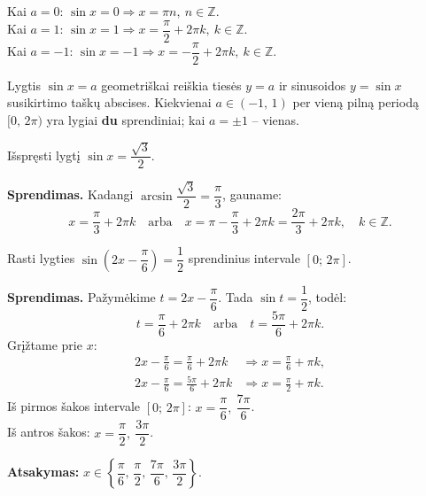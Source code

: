 \begin{remark}
Kai \(a = 0\): \(\sin x = 0 \Rightarrow x = \pi n,\ n \in \mathbb{Z}\).\\
Kai \(a = 1\): \(\sin x = 1 \Rightarrow x = \dfrac{\pi}{2} + 2\pi k,\ k \in \mathbb{Z}\).\\
Kai \(a = -1\): \(\sin x = -1 \Rightarrow x = -\dfrac{\pi}{2} + 2\pi k,\ k \in \mathbb{Z}\).
\end{remark}

\begin{tcolorbox}[title={Geometrinė interpretacija}]
Lygtis \(\sin x = a\) geometriškai reiškia tiesės \(y = a\) ir sinusoidos \(y = \sin x\) susikirtimo taškų abscises. Kiekvienai \(a \in (-1,\, 1)\) per vieną pilną periodą \([0,\, 2\pi)\) yra lygiai \textbf{du} sprendiniai; kai \(a = \pm 1\) – vienas.
\end{tcolorbox}

\begin{example}
Išspręsti lygtį \(\sin x = \dfrac{\sqrt{3}}{2}\).

\textbf{Sprendimas.} Kadangi \(\arcsin\dfrac{\sqrt{3}}{2} = \dfrac{\pi}{3}\), gauname:
\[
x = \frac{\pi}{3} + 2\pi k \quad \text{arba} \quad x = \pi - \frac{\pi}{3} + 2\pi k = \frac{2\pi}{3} + 2\pi k, \quad k \in \mathbb{Z}.
\]
\end{example}

\begin{example}
Rasti lygties \(\sin\!\left(2x - \dfrac{\pi}{6}\right) = \dfrac{1}{2}\) sprendinius intervale \([0;\, 2\pi]\).

\textbf{Sprendimas.} Pažymėkime \(t = 2x - \dfrac{\pi}{6}\). Tada \(\sin t = \dfrac{1}{2}\), todėl:
\[
t = \frac{\pi}{6} + 2\pi k \quad \text{arba} \quad t = \frac{5\pi}{6} + 2\pi k.
\]
Grįžtame prie \(x\):
\begin{align*}
2x - \frac{\pi}{6} = \frac{\pi}{6} + 2\pi k &\Rightarrow x = \frac{\pi}{6} + \pi k,\\
2x - \frac{\pi}{6} = \frac{5\pi}{6} + 2\pi k &\Rightarrow x = \frac{\pi}{2} + \pi k.
\end{align*}
Iš pirmos šakos intervale \([0;\, 2\pi]\): \(x = \dfrac{\pi}{6},\ \dfrac{7\pi}{6}\).\\
Iš antros šakos: \(x = \dfrac{\pi}{2},\ \dfrac{3\pi}{2}\).

\textbf{Atsakymas:} \(x \in \left\{\dfrac{\pi}{6},\, \dfrac{\pi}{2},\, \dfrac{7\pi}{6},\, \dfrac{3\pi}{2}\right\}\).
\end{example}

